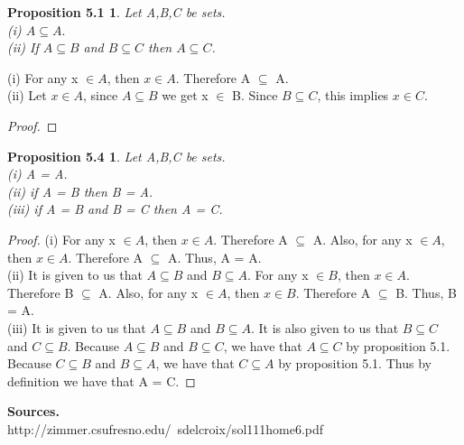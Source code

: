 \documentclass[12pt]{amsart}
\begin{document}
\newtheorem*{prop5.1}{Proposition 5.1}
\begin{prop5.1}
	Let A,B,C be sets.
	\\(i) $A \subseteq A.$
	\\(ii) If $A \subseteq B$ and $B \subseteq C$ then $A \subseteq C$.
\end{prop5.1}
(i) For any x $\in A$, then $x \in A$. Therefore A $\subseteq$ A.
\\\indent(ii) Let $x \in A$, since $A \subseteq B$ we get x $\in$ B. Since $B \subseteq C$, this implies $x \in C$.
\begin{proof}
\end{proof}

\newtheorem*{prop5.4}{Proposition 5.4}
\begin{prop5.4}
	Let A,B,C be sets.
	\\(i) A = A.
	\\(ii) if A = B then B = A.
	\\(iii) if A = B and B = C then A = C.
\end{prop5.4}

\begin{proof}
	(i) For any x $\in A$, then $x \in A$. Therefore A $\subseteq$ A. Also, for any x $\in A$, then $x \in A$. Therefore A $\subseteq$ A. Thus, A = A.
\\\indent(ii) It is given to us that $A \subseteq B$ and $B \subseteq A$. For any x $\in B$, then $x \in A$. Therefore B $\subseteq$ A. Also, for any x $\in A$, then $x \in B$. Therefore A $\subseteq$ B. Thus, B = A.
\\\indent(iii) It is given to us that $A \subseteq B$ and $B \subseteq A$. It is also given to us that $B \subseteq C$ and $C \subseteq B$. Because $A \subseteq B$ and $B \subseteq C$, we have that $A \subseteq C$ by proposition 5.1. Because $C \subseteq B$ and $B \subseteq A$, we have that $C \subseteq A$ by proposition 5.1. Thus by definition we have that A = C.
\end{proof}
\noindent\textbf{Sources.}
\\http://zimmer.csufresno.edu/~sdelcroix/sol111home6.pdf
\end{document}
